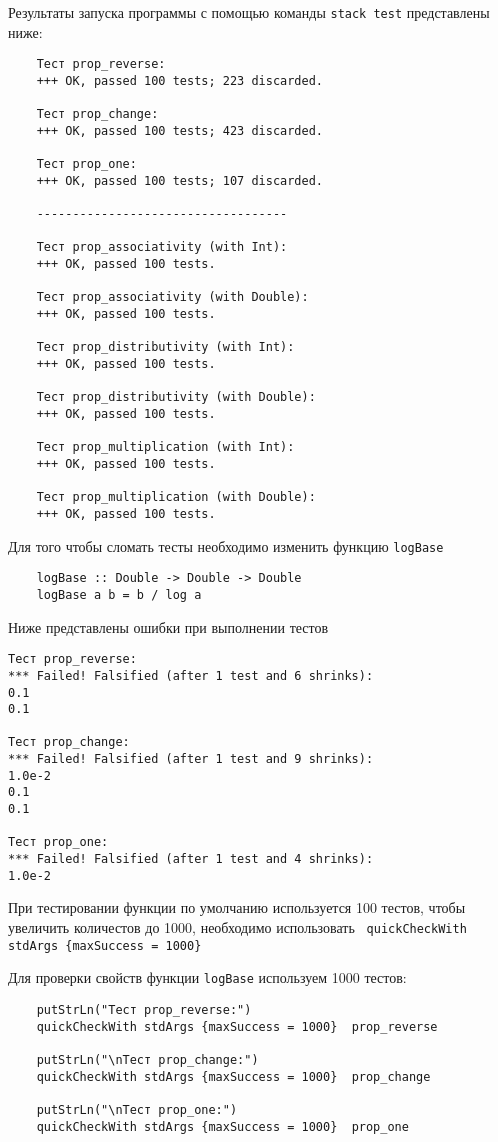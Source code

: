\documentclass[10pt,a4paper,final]{article} %
\begin{document}
Результаты запуска программы с помощью команды \texttt{stack test} представлены ниже:
\begin{lstlisting} 
	Тест prop_reverse:
	+++ OK, passed 100 tests; 223 discarded.
	
	Тест prop_change:
	+++ OK, passed 100 tests; 423 discarded.
	
	Тест prop_one:
	+++ OK, passed 100 tests; 107 discarded.
	
	-----------------------------------
	
	Тест prop_associativity (with Int):
	+++ OK, passed 100 tests.
	
	Тест prop_associativity (with Double):
	+++ OK, passed 100 tests.
	
	Тест prop_distributivity (with Int):
	+++ OK, passed 100 tests.
	
	Тест prop_distributivity (with Double):
	+++ OK, passed 100 tests.
	
	Тест prop_multiplication (with Int):
	+++ OK, passed 100 tests.
	
	Тест prop_multiplication (with Double):
	+++ OK, passed 100 tests.
\end{lstlisting}

Для того чтобы сломать тесты необходимо изменить функцию \texttt{logBase} 

\begin{lstlisting}
	logBase :: Double -> Double -> Double
	logBase a b = b / log a
\end{lstlisting}

Ниже представлены ошибки при выполнении тестов

\begin{lstlisting}
Тест prop_reverse:
*** Failed! Falsified (after 1 test and 6 shrinks):    
0.1
0.1

Тест prop_change:
*** Failed! Falsified (after 1 test and 9 shrinks):    
1.0e-2
0.1
0.1

Тест prop_one:
*** Failed! Falsified (after 1 test and 4 shrinks):
1.0e-2
\end{lstlisting}

При тестировании функции по умолчанию используется 100 тестов, чтобы увеличить количестов до 1000, необходимо использовать \lstinline| quickCheckWith stdArgs {maxSuccess = 1000}|

Для проверки свойств функции \texttt{logBase} используем 1000 тестов:
\begin{lstlisting}
	putStrLn("Тест prop_reverse:")
	quickCheckWith stdArgs {maxSuccess = 1000}  prop_reverse
	
	putStrLn("\nТест prop_change:")
	quickCheckWith stdArgs {maxSuccess = 1000}  prop_change
	
	putStrLn("\nТест prop_one:")
	quickCheckWith stdArgs {maxSuccess = 1000}  prop_one
	
\end{lstlisting}
\end{document}
